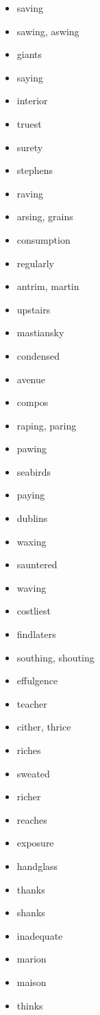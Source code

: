 \documentclass{article}
\begin{document}
\begin{itemize}
    \item saving
    \item sawing, aswing
    \item giants
    \item saying
    \item interior
    \item truest
    \item surety
    \item stephens
    \item raving
    \item arsing, grains
    \item consumption
    \item regularly
    \item antrim, martin
    \item upstairs
    \item mastiansky
    \item condensed
    \item avenue
    \item compos
    \item raping, paring
    \item pawing
    \item seabirds
    \item paying
    \item dublins
    \item waxing
    \item sauntered
    \item waving
    \item costliest
    \item findlaters
    \item southing, shouting
    \item effulgence
    \item teacher
    \item cither, thrice
    \item riches
    \item sweated
    \item richer
    \item reaches
    \item exposure
    \item handglass
    \item thanks
    \item shanks
    \item inadequate
    \item marion
    \item maison
    \item thinks

\end{itemize}
\end{document}
